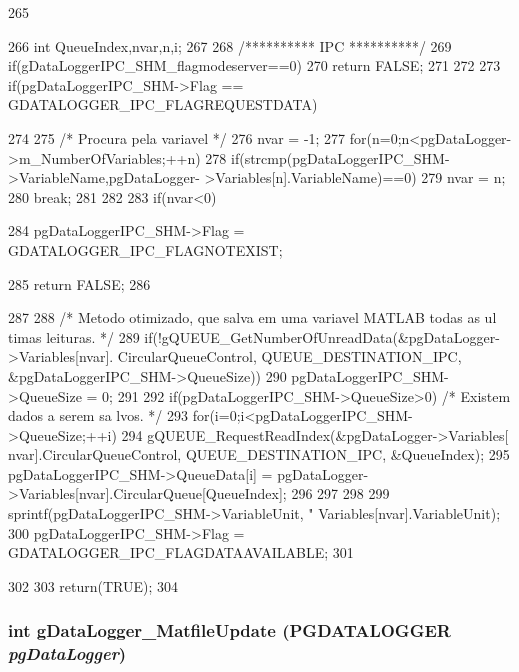 \begin{DoxyCode}
265 {
266         int QueueIndex,nvar,n,i;
267 
268         /********** IPC **********/
269         if(gDataLoggerIPC_SHM_flagmodeserver==0){
270                 return FALSE;
271         }
272         
273         if(pgDataLoggerIPC_SHM->Flag == GDATALOGGER_IPC_FLAGREQUESTDATA){
274                 
275                 /* Procura pela variavel */
276                 nvar = -1;
277                 for(n=0;n<pgDataLogger->m_NumberOfVariables;++n){
278                         if(strcmp(pgDataLoggerIPC_SHM->VariableName,pgDataLogger-
      >Variables[n].VariableName)==0){
279                                 nvar = n;
280                                 break;
281                         }
282                 }
283                 if(nvar<0){
284                         pgDataLoggerIPC_SHM->Flag = GDATALOGGER_IPC_FLAGNOTEXIST;
      
285                         return FALSE; 
286                 }
287 
288                 /* Metodo otimizado, que salva em uma variavel MATLAB todas as ul
      timas leituras. */
289                 if(!gQUEUE_GetNumberOfUnreadData(&pgDataLogger->Variables[nvar].
      CircularQueueControl, QUEUE_DESTINATION_IPC, &pgDataLoggerIPC_SHM->QueueSize)){
290                         pgDataLoggerIPC_SHM->QueueSize = 0;
291                 }
292                 if(pgDataLoggerIPC_SHM->QueueSize>0){ /* Existem dados a serem sa
      lvos. */
293                         for(i=0;i<pgDataLoggerIPC_SHM->QueueSize;++i){
294                                 gQUEUE_RequestReadIndex(&pgDataLogger->Variables[
      nvar].CircularQueueControl, QUEUE_DESTINATION_IPC, &QueueIndex);
295                                 pgDataLoggerIPC_SHM->QueueData[i] = pgDataLogger-
      >Variables[nvar].CircularQueue[QueueIndex];
296                         }
297                 }
298                 
299                 sprintf(pgDataLoggerIPC_SHM->VariableUnit, "%
      Variables[nvar].VariableUnit);
300                 pgDataLoggerIPC_SHM->Flag = GDATALOGGER_IPC_FLAGDATAAVAILABLE;
301         }
302 
303         return(TRUE);
304 }
\end{DoxyCode}
\subsubsection[{gDataLogger\_\-MatfileUpdate}]{\setlength{\rightskip}{0pt plus 5cm}int gDataLogger\_\-MatfileUpdate ({\bf PGDATALOGGER} {\em pgDataLogger})}\label{gdatalogger_8c_a05dc8ce832b941280d7de26057992640}



